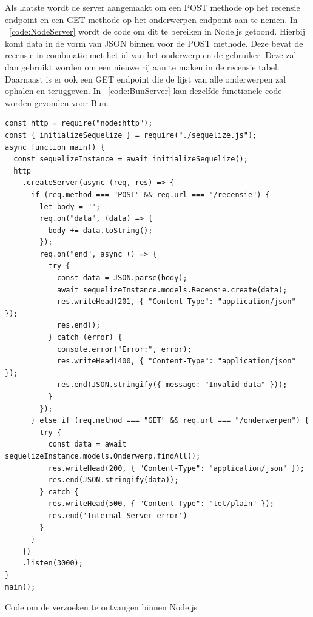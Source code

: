 Als laatste wordt de server aangemaakt om een POST methode op het recensie endpoint en een GET methode op het onderwerpen endpoint aan te nemen.
In ~\ref{code:NodeServer} wordt de code om dit te bereiken in Node.js getoond. Hierbij komt data in de vorm van JSON binnen voor de POST methode.
Deze bevat de recensie in combinatie met het id van het onderwerp en de gebruiker.
Deze zal dan gebruikt worden om een nieuwe rij aan te maken in de recensie tabel.
Daarnaast is er ook een GET endpoint die de lijst van alle onderwerpen zal ophalen en teruggeven.
In ~\ref{code:BunServer} kan dezelfde functionele code worden gevonden voor Bun.

\begin{listing}[H]
  \centering
  \begin{verbatim}
const http = require("node:http");
const { initializeSequelize } = require("./sequelize.js");
async function main() {
  const sequelizeInstance = await initializeSequelize();
  http
    .createServer(async (req, res) => {
      if (req.method === "POST" && req.url === "/recensie") {
        let body = "";
        req.on("data", (data) => {
          body += data.toString(); 
        });
        req.on("end", async () => {
          try {
            const data = JSON.parse(body);
            await sequelizeInstance.models.Recensie.create(data);
            res.writeHead(201, { "Content-Type": "application/json" });
            res.end();
          } catch (error) {
            console.error("Error:", error);
            res.writeHead(400, { "Content-Type": "application/json" });
            res.end(JSON.stringify({ message: "Invalid data" }));
          }
        });
      } else if (req.method === "GET" && req.url === "/onderwerpen") {
        try {
          const data = await sequelizeInstance.models.Onderwerp.findAll();
          res.writeHead(200, { "Content-Type": "application/json" });
          res.end(JSON.stringify(data));
        } catch {
          res.writeHead(500, { "Content-Type": "tet/plain" });
          res.end('Internal Server error')
        }
      }
    })
    .listen(3000);
}
main();
\end{verbatim}
\caption{\label{code:NodeServer}Code om de verzoeken te ontvangen binnen Node.js}
\end{listing}
